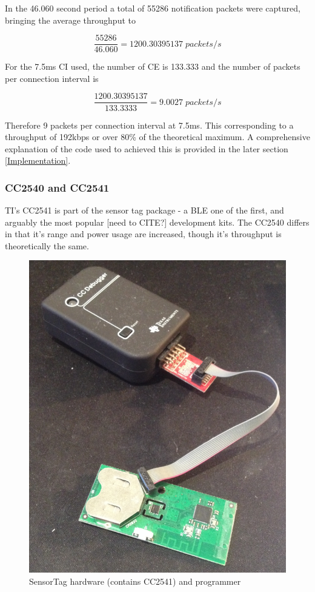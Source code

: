 \documentclass[]{article}
\begin{document}
In the 46.060 second period a total of 55286 notification packets were captured, bringing the average throughput to


\begin{displaymath}
\frac{55286}{46.060} = 1200.30395137\; packets/s
\end{displaymath}

For the 7.5ms \ac{CI} used, the number of \ac{CE} is 133.333 and the number of packets per connection interval is

\begin{displaymath}
\frac{1200.30395137}{133.3333} = 9.0027\; packets/s
\end{displaymath}

Therefore 9 packets per connection interval at 7.5ms. This corresponding to a throughput of 192kbps or over 80\% of the theoretical maximum. A comprehensive explanation of the code used to achieved this is provided in the later section \ref{Implementation}. 

\clearpage
\subsubsection{CC2540 and CC2541}
\ac{TI}'s CC2541 is part of the sensor tag package - a \ac{BLE} one of the first, and arguably the most popular [need to CITE?] development kits. The CC2540 differs in that it's range and power usage are increased, though it's throughput is theoretically the same.

\begin{figure}[H]
	\begin{center}
		\includegraphics[width = \textwidth]{sensortag}
	\end{center}
	\caption{SensorTag hardware (contains CC2541) and programmer}
	\label{fig:sensortag}
\end{figure}
\end{document}
